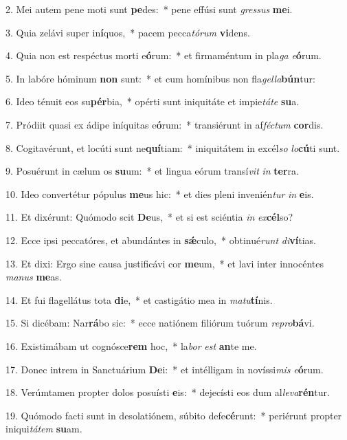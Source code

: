2. Mei autem pene moti sunt \textbf{pe}des:~*  pene effúsi sunt \textit{gres}\textit{sus} \textbf{me}i.\

3. Quia zelávi super in\textbf{í}quos,~*  pacem pecca\textit{tó}\textit{rum} \textbf{vi}dens.\

4. Quia non est respéctus morti e\textbf{ó}rum:~*  et firmaméntum in pla\textit{ga} \textit{e}\textbf{ó}rum.\

5. In labóre hóminum \textbf{non} sunt:~*  et cum homínibus non fla\textit{gel}\textit{la}\textbf{bún}tur:\

6. Ideo ténuit eos su\textbf{pér}bia,~*  opérti sunt iniquitáte et impie\textit{tá}\textit{te} \textbf{su}a.\

7. Pródiit quasi ex ádipe iníquitas e\textbf{ó}rum:~*  transiérunt in af\textit{féc}\textit{tum} \textbf{cor}dis.\

8. Cogitavérunt, et locúti sunt ne\textbf{quí}tiam:~*  iniquitátem in excél\textit{so} \textit{lo}\textbf{cú}ti sunt.\

9. Posuérunt in cælum os \textbf{su}um:~*  et lingua eórum transí\textit{vit} \textit{in} \textbf{ter}ra.\

10. Ideo convertétur pópulus \textbf{me}us hic:~*  et dies pleni invenién\textit{tur} \textit{in} \textbf{e}is.\

11. Et dixérunt: Quómodo scit \textbf{De}us,~*  et si est sciéntia \textit{in} \textit{ex}\textbf{cél}so?\

12. Ecce ipsi peccatóres, et abundántes in \textbf{sǽ}culo,~*  obtinué\textit{runt} \textit{di}\textbf{ví}tias.\

13. Et dixi: Ergo sine causa justificávi cor \textbf{me}um,~*  et lavi inter innocéntes \textit{ma}\textit{nus} \textbf{me}as.\

14. Et fui flagellátus tota \textbf{di}e,~*  et castigátio mea in \textit{ma}\textit{tu}\textbf{tí}nis.\

15. Si dicébam: Nar\textbf{rá}bo sic:~*  ecce natiónem filiórum tuórum \textit{re}\textit{pro}\textbf{bá}vi.\

16. Existimábam ut cognósce\textbf{rem} hoc,~*  la\textit{bor} \textit{est} \textbf{an}te me.\

17. Donec intrem in Sanctuárium \textbf{De}i:~*  et intélligam in novíssi\textit{mis} \textit{e}\textbf{ó}rum.\

18. Verúmtamen propter dolos posuísti \textbf{e}is:~*  dejecísti eos dum al\textit{le}\textit{va}\textbf{rén}tur.\

19. Quómodo facti sunt in desolatiónem, súbito defe\textbf{cé}runt:~*  periérunt propter iniqui\textit{tá}\textit{tem} \textbf{su}am.\

